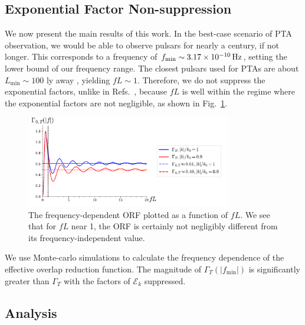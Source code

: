 \documentclass[prd,aps,psfig,nofootinbib,nobibnotes,superscriptaddress,preprintnumbers,times]{revtex4-2}\setlength{\topmargin}{-14mm}
\newcommand{\Hz}{\,{\rm Hz}}
\begin{document}
\subsection{Exponential Factor Non-suppression}\label{sec:exp_fac}
We now present the main results of this work. In the best-case scenario of PTA observation, we would be able to observe pulsars for nearly a century, if not longer. This corresponds to a frequency of $f_{\text{min}} \sim 3.17 \times 10^{-10} \Hz$, setting the lower bound of our frequency range. The closest pulsars used for PTAs are about $L_{\text{min}} \sim 100$ ly away \cite{Anholm:2008wy}, yielding $fL \sim 1$. Therefore, we do not suppress the exponential factors, unlike in Refs.\ \cite{Liang:2021bct,Arjona:2024cex}, because $fL$ is well within the regime where the exponential factors are not negligible, as shown in Fig.\ \ref{fig:freq_dep}.
\begin{figure}[h]
    \centering
    \includegraphics[width=0.8\textwidth]{fig2.pdf}
    \caption{The frequency-dependent ORF plotted as a function of $fL$. We see that for $fL$ near 1, the ORF is certainly not negligibly different from its frequency-independent value.}
    \label{fig:freq_dep}
\end{figure}
We use Monte-carlo simulations to calculate the frequency dependence of the effective overlap reduction function. The magnitude of $\Gamma_T(|f_{\text{min}}|)$ is significantly greater than $\Gamma_T$ with the factors of $\mathcal{E}_k$ suppressed. 

\subsection{Analysis}\label{sec:analysis}
\end{document}
